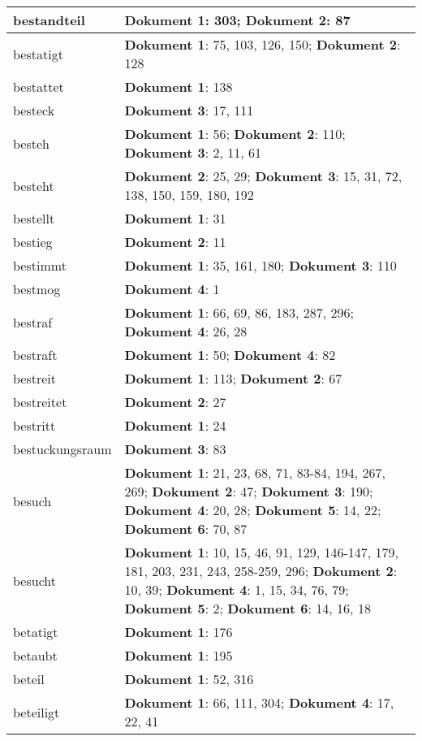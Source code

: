 \documentclass[a5paper]{article}
\begin{document}
\begin{longtable}[l]{|l|p{3in}|}
\hline
bestandteil & \textbf{Dokument 1}: 303; \textbf{Dokument 2}: 87 \\
\hline
bestatigt & \textbf{Dokument 1}: 75, 103, 126, 150; \textbf{Dokument 2}: 128 \\
\hline
bestattet & \textbf{Dokument 1}: 138 \\
\hline
besteck & \textbf{Dokument 3}: 17, 111 \\
\hline
besteh & \textbf{Dokument 1}: 56; \textbf{Dokument 2}: 110; \textbf{Dokument 3}: 2, 11, 61 \\
\hline
besteht & \textbf{Dokument 2}: 25, 29; \textbf{Dokument 3}: 15, 31, 72, 138, 150, 159, 180, 192 \\
\hline
bestellt & \textbf{Dokument 1}: 31 \\
\hline
bestieg & \textbf{Dokument 2}: 11 \\
\hline
bestimmt & \textbf{Dokument 1}: 35, 161, 180; \textbf{Dokument 3}: 110 \\
\hline
bestmog & \textbf{Dokument 4}: 1 \\
\hline
bestraf & \textbf{Dokument 1}: 66, 69, 86, 183, 287, 296; \textbf{Dokument 4}: 26, 28 \\
\hline
bestraft & \textbf{Dokument 1}: 50; \textbf{Dokument 4}: 82 \\
\hline
bestreit & \textbf{Dokument 1}: 113; \textbf{Dokument 2}: 67 \\
\hline
bestreitet & \textbf{Dokument 2}: 27 \\
\hline
bestritt & \textbf{Dokument 1}: 24 \\
\hline
bestuckungsraum & \textbf{Dokument 3}: 83 \\
\hline
besuch & \textbf{Dokument 1}: 21, 23, 68, 71, 83-84, 194, 267, 269; \textbf{Dokument 2}: 47; \textbf{Dokument 3}: 190; \textbf{Dokument 4}: 20, 28; \textbf{Dokument 5}: 14, 22; \textbf{Dokument 6}: 70, 87 \\
\hline
besucht & \textbf{Dokument 1}: 10, 15, 46, 91, 129, 146-147, 179, 181, 203, 231, 243, 258-259, 296; \textbf{Dokument 2}: 10, 39; \textbf{Dokument 4}: 1, 15, 34, 76, 79; \textbf{Dokument 5}: 2; \textbf{Dokument 6}: 14, 16, 18 \\
\hline
betatigt & \textbf{Dokument 1}: 176 \\
\hline
betaubt & \textbf{Dokument 1}: 195 \\
\hline
beteil & \textbf{Dokument 1}: 52, 316 \\
\hline
beteiligt & \textbf{Dokument 1}: 66, 111, 304; \textbf{Dokument 4}: 17, 22, 41 \\

\end{longtable}
\end{document}
